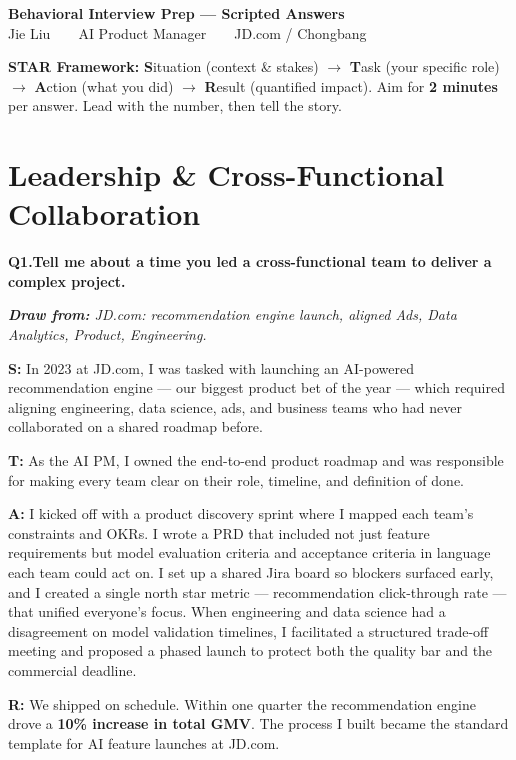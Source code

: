 \documentclass[10pt, letterpaper]{article}
\newcommand{\q}[2]{%
    \smallskip
    \noindent\textbf{\small Q#1.}\quad\textbf{#2}
    \vspace{3pt}
}
\newcommand{\hint}[1]{%
    \begin{notebox}
    \footnotesize\textit{\textbf{Draw from:} #1}
    \end{notebox}
}
\newcommand{\s}[1]{\textbf{\textcolor{starlabel}{S:}} #1}
\newcommand{\ta}[1]{\textbf{\textcolor{starlabel}{T:}} #1}
\newcommand{\ac}[1]{\textbf{\textcolor{starlabel}{A:}} #1}
\newcommand{\res}[1]{\textbf{\textcolor{starlabel}{R:}} #1}
\begin{document}
\begin{center}
    {\Large\bfseries\color{primary} Behavioral Interview Prep --- Scripted Answers}\\[2pt]
    {\small\color{accent} Jie Liu\ \ \textbar\ \ AI Product Manager\ \ \textbar\ \ JD.com / Chongbang}
\end{center}

\vspace{-2pt}
\begin{notebox}
\footnotesize\textbf{STAR Framework:} \textbf{S}ituation (context \& stakes) $\to$ \textbf{T}ask (your specific role) $\to$ \textbf{A}ction (what you did) $\to$ \textbf{R}esult (quantified impact). Aim for \textbf{2 minutes} per answer. Lead with the number, then tell the story.
\end{notebox}

\section{Leadership \& Cross-Functional Collaboration}

\q{1}{Tell me about a time you led a cross-functional team to deliver a complex project.}
\hint{JD.com: recommendation engine launch, aligned Ads, Data Analytics, Product, Engineering.}

\begin{answerbox}
\footnotesize
\s{In 2023 at JD.com, I was tasked with launching an AI-powered recommendation engine --- our biggest product bet of the year --- which required aligning engineering, data science, ads, and business teams who had never collaborated on a shared roadmap before.}

\medskip
\ta{As the AI PM, I owned the end-to-end product roadmap and was responsible for making every team clear on their role, timeline, and definition of done.}

\medskip
\ac{I kicked off with a product discovery sprint where I mapped each team's constraints and OKRs. I wrote a PRD that included not just feature requirements but model evaluation criteria and acceptance criteria in language each team could act on. I set up a shared Jira board so blockers surfaced early, and I created a single north star metric --- recommendation click-through rate --- that unified everyone's focus. When engineering and data science had a disagreement on model validation timelines, I facilitated a structured trade-off meeting and proposed a phased launch to protect both the quality bar and the commercial deadline.}

\medskip
\res{We shipped on schedule. Within one quarter the recommendation engine drove a \textbf{10\% increase in total GMV}. The process I built became the standard template for AI feature launches at JD.com.}
\end{answerbox}
\end{document}
